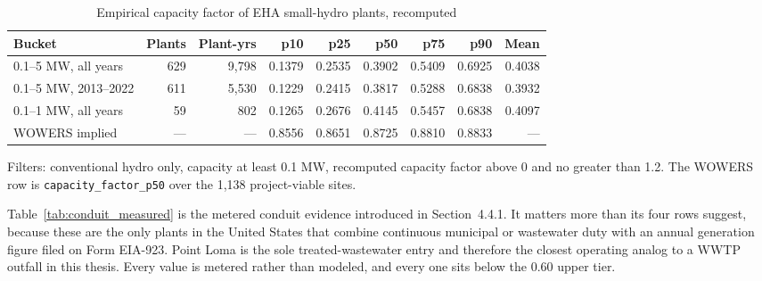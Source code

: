 \documentclass[12pt,letterpaper]{report}
\begin{document}
\begin{table}[htbp]
\centering
\caption{Empirical capacity factor of EHA small-hydro plants, recomputed}
\label{tab:eha_buckets}
\footnotesize
\begin{tabular}{@{}lrrrrrrrr@{}}
\toprule
Bucket & Plants & Plant-yrs & p10 & p25 & p50 & p75 & p90 & Mean \\
\midrule
0.1--5 MW, all years  & 629 & 9{,}798 & 0.1379 & 0.2535 & 0.3902 & 0.5409 & 0.6925 & 0.4038 \\
0.1--5 MW, 2013--2022 & 611 & 5{,}530 & 0.1229 & 0.2415 & 0.3817 & 0.5288 & 0.6838 & 0.3932 \\
0.1--1 MW, all years  & 59  & 802     & 0.1265 & 0.2676 & 0.4145 & 0.5457 & 0.6838 & 0.4097 \\
\midrule
WOWERS implied        & --- & ---     & 0.8556 & 0.8651 & 0.8725 & 0.8810 & 0.8833 & --- \\
\bottomrule
\end{tabular}

\vspace{0.4em}
{\footnotesize Filters: conventional hydro only, capacity at least 0.1 MW,
recomputed capacity factor above 0 and no greater than 1.2. The WOWERS row is
\texttt{capacity\_factor\_p50} over the 1,138 project-viable sites.}
\end{table}

Table~\ref{tab:conduit_measured} is the metered conduit evidence introduced in
Section~4.4.1. It matters more than its four rows suggest, because these are the only
plants in the United States that combine continuous municipal or wastewater duty with
an annual generation figure filed on Form EIA-923. Point Loma is the sole
treated-wastewater entry and therefore the closest operating analog to a WWTP outfall
in this thesis. Every value is metered rather than modeled, and every one sits below
the 0.60 upper tier.
\end{document}
